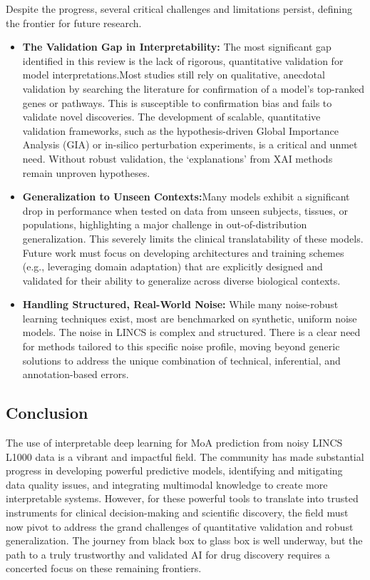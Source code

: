 \documentclass[twocolumn]{article}
\begin{document}
Despite the progress, several critical challenges and limitations persist, defining the frontier for future research.
    \begin{itemize}
        \item \textbf{The Validation Gap in Interpretability: } The most significant gap identified in this review is the lack of rigorous, quantitative validation for model interpretations.Most studies still rely on qualitative, anecdotal validation by searching the literature for confirmation of a model's top-ranked genes or pathways\cite{samal2022opportunities}. This is susceptible to confirmation bias and fails to validate novel discoveries. The development of scalable, quantitative validation frameworks, such as the hypothesis-driven Global Importance Analysis (GIA) or in-silico perturbation experiments, is a critical and unmet need. Without robust validation, the `explanations' from XAI methods remain unproven hypotheses.
        \item \textbf{Generalization to Unseen Contexts:}Many models exhibit a significant drop in performance when tested on data from unseen subjects, tissues, or populations, highlighting a major challenge in out-of-distribution generalization\cite{mcdermott2019deep}. This severely limits the clinical translatability of these models. Future work must focus on developing architectures and training schemes (e.g., leveraging domain adaptation) that are explicitly designed and validated for their ability to generalize across diverse biological contexts.
        \item \textbf{Handling Structured, Real-World Noise:} While many noise-robust learning techniques exist, most are benchmarked on synthetic, uniform noise models. The noise in LINCS is complex and structured. There is a clear need for methods tailored to this specific noise profile, moving beyond generic solutions to address the unique combination of technical, inferential, and annotation-based errors.
    \end{itemize}

\subsection{Conclusion}
The use of interpretable deep learning for MoA prediction from noisy LINCS L1000 data is a vibrant and impactful field. The community has made substantial progress in developing powerful predictive models, identifying and mitigating data quality issues, and integrating multimodal knowledge to create more interpretable systems. However, for these powerful tools to translate into trusted instruments for clinical decision-making and scientific discovery, the field must now pivot to address the grand challenges of quantitative validation and robust generalization. The journey from black box to glass box is well underway, but the path to a truly trustworthy and validated AI for drug discovery requires a concerted focus on these remaining frontiers.
\end{document}
